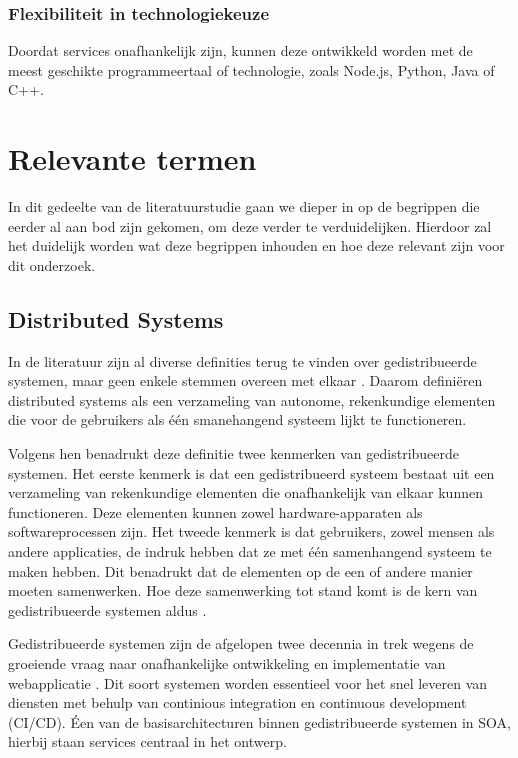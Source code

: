 \subsubsection{Flexibiliteit in technologiekeuze}

Doordat services onafhankelijk zijn, kunnen deze ontwikkeld worden met de meest geschikte programmeertaal of technologie, zoals Node.js, Python, Java of C++.

\section{Relevante termen}

In dit gedeelte van de literatuurstudie gaan we dieper in op de begrippen die eerder al aan bod zijn gekomen, om deze verder te verduidelijken. Hierdoor zal het duidelijk worden wat deze begrippen inhouden en hoe deze relevant zijn voor dit onderzoek.

\subsection{Distributed Systems}
\label{sec:distributed systems}

In de literatuur zijn al diverse definities terug te vinden over gedistribueerde systemen, maar geen enkele stemmen overeen met elkaar \autocite{Steen2018}. Daarom definiëren \textcite{Steen2018} distributed systems als een verzameling van autonome, rekenkundige elementen die voor de gebruikers als één smanehangend systeem lijkt te functioneren.

Volgens hen benadrukt deze definitie twee kenmerken van gedistribueerde systemen. Het eerste kenmerk is dat een gedistribueerd systeem bestaat uit een verzameling van rekenkundige elementen die onafhankelijk van elkaar kunnen functioneren. Deze elementen kunnen zowel hardware-apparaten als softwareprocessen zijn. Het tweede kenmerk is dat gebruikers, zowel mensen als andere applicaties, de indruk hebben dat ze met één samenhangend systeem te maken hebben. Dit benadrukt dat de elementen op de een of andere manier moeten samenwerken. Hoe deze samenwerking tot stand komt is de kern van gedistribueerde systemen aldus \textcite{Steen2018}.

Gedistribueerde systemen zijn de afgelopen twee decennia in trek wegens de groeiende vraag naar onafhankelijke ontwikkeling en implementatie van webapplicatie \autocite{Raj2021}. Dit soort systemen worden essentieel voor het snel leveren van diensten met behulp van continious integration en continuous development (CI/CD). Éen van de basisarchitecturen binnen gedistribueerde systemen in SOA, hierbij staan services centraal in het ontwerp.

